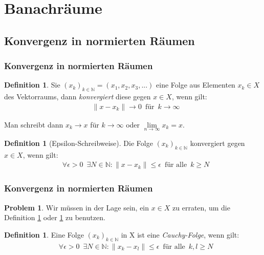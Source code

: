 \documentclass[t, handout]{beamer}
\newcommand{\N}{\mathbb{N}}
\theoremstyle{definition} %
\newtheorem{dfi}[sa]{Definition} %
\newtheorem*{prob}{Problem}
\begin{document}
\section{Banachräume}
\subsection{Konvergenz in normierten Räumen}

\begin{frame}
\frametitle{Konvergenz in normierten Räumen}
\begin{dfi}
\label{konv}
Sie ${(x_k)}_{k \in \N} = (x_1, x_2, x_3, . . .)$ eine Folge aus Elementen $x_k \in X$ des Vektorraums, dann \textit{konvergiert} diese gegen $x \in X$, wenn gilt:
\begin{align*}
& \|x - x_k\| \rightarrow 0 \enspace \text{für} \enspace k \rightarrow \infty
\end{align*}
\end{dfi}
\pause
Man schreibt dann $x_k \rightarrow x$ für $k \rightarrow \infty$ oder $\lim\limits_{n \to \infty}{x_k} = x$.
\pause
\begin{dfi}[Epsilon-Schreibweise]
\label{konv_eps}
 Die Folge ${(x_k)}_{k \in \N}$ konvergiert gegen $x \in X$, wenn gilt:
\begin{align*}
& \forall \epsilon > 0 \enspace \exists N \in \N : \|x - x_k\| \leq \epsilon \enspace \text{für alle} \enspace k \geq N
\end{align*}
\end{dfi}
\end{frame}

\begin{frame}
\frametitle{Konvergenz in normierten Räumen}
\begin{prob}
Wir müssen in der Lage sein, ein $x \in X$ zu erraten, um die Definition \hyperref[konv]{\ref*{konv}} oder \hyperref[konv_eps]{\ref*{konv_eps}} zu benutzen.
\end{prob}
\pause
\begin{dfi}
\label{konv_cau}
Eine Folge ${(x_k)}_{k \in \N}$ in X ist eine \textit{Cauchy-Folge}, wenn gilt:
\begin{align*}
& \forall \epsilon > 0 \enspace \exists N \in \N : \|x_k - x_l\| \leq \epsilon \enspace \text{für alle} \enspace k,l \geq N
\end{align*}
\end{dfi}
\end{frame}
\end{document}
